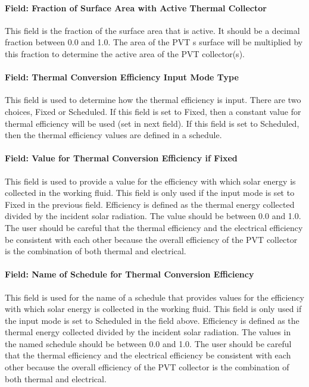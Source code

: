 \paragraph{Field: Fraction of Surface Area with Active Thermal Collector}\label{field-fraction-of-surface-area-with-active-thermal-collector}

This field is the fraction of the surface area that is active. It should be a decimal fraction between 0.0 and 1.0. The area of the PVT s surface will be multiplied by this fraction to determine the active area of the PVT collector(s).

\paragraph{Field: Thermal Conversion Efficiency Input Mode Type}\label{field-thermal-conversion-efficiency-input-mode-type}

This field is used to determine how the thermal efficiency is input. There are two choices, Fixed or Scheduled. If this field is set to Fixed, then a constant value for thermal efficiency will be used (set in next field). If this field is set to Scheduled, then the thermal efficiency values are defined in a schedule.

\paragraph{Field: Value for Thermal Conversion Efficiency if Fixed}\label{field-value-for-thermal-conversion-efficiency-if-fixed}

This field is used to provide a value for the efficiency with which solar energy is collected in the working fluid. This field is only used if the input mode is set to Fixed in the previous field. Efficiency is defined as the thermal energy collected divided by the incident solar radiation. The value should be between 0.0 and 1.0. The user should be careful that the thermal efficiency and the electrical efficiency be consistent with each other because the overall efficiency of the PVT collector is the combination of both thermal and electrical.

\paragraph{Field: Name of Schedule for Thermal Conversion Efficiency}\label{field-name-of-schedule-for-thermal-conversion-efficiency}

This field is used for the name of a schedule that provides values for the efficiency with which solar energy is collected in the working fluid. This field is only used if the input mode is set to Scheduled in the field above. Efficiency is defined as the thermal energy collected divided by the incident solar radiation. The values in the named schedule should be between 0.0 and 1.0. The user should be careful that the thermal efficiency and the electrical efficiency be consistent with each other because the overall efficiency of the PVT collector is the combination of both thermal and electrical.

